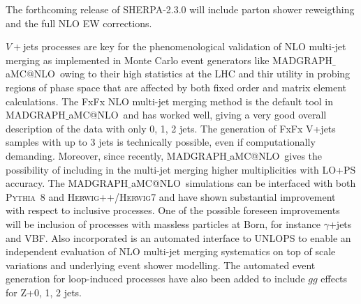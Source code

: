 \documentclass[a4paper,11pt,notoc]{article}
\makeatletter
\newcommand{\PYTHIA}{\textsc{Pythia}}
\newcommand{\HERWIG}{\textsc{Herwig}}
\newcommand{\MGNLO}{MADGRAPH$\_$aMC@NLO}
\makeatother
\begin{document}
The forthcoming release of SHERPA-2.3.0 will include parton shower reweigthing and the full NLO EW corrections.

$V+$jets processes are key for the phenomenological validation of NLO multi-jet merging as implemented in Monte Carlo event generators like \MGNLO\, owing to their high statistics at the LHC and thir utility in probing regions of phase space that are affected by both fixed order and matrix element calculations. The FxFx NLO multi-jet merging method is the default tool in \MGNLO\ and has worked well, giving a very good overall description of the data with only 0, 1, 2 jets. 
The generation of FxFx V+jets samples with up to 3 jets is technically possible,
even if computationally demanding. Moreover, since recently, \MGNLO\, gives the
possibility of including in the multi-jet merging higher multiplicities with
LO+PS accuracy.
The \MGNLO\ simulations can be interfaced with both \PYTHIA\ 8 and \HERWIG++/\HERWIG7 and have shown substantial improvement with respect to inclusive processes. One of the possible foreseen improvements will be inclusion of processes with massless particles at Born, for instance $\gamma$+jets and VBF. Also incorporated is an automated interface to UNLOPS to enable an independent evaluation of NLO multi-jet merging systematics on top of scale variations and underlying event shower modelling. The automated event generation for loop-induced processes have also been added to include $gg$ effects for Z+0, 1, 2 jets.
\end{document}
